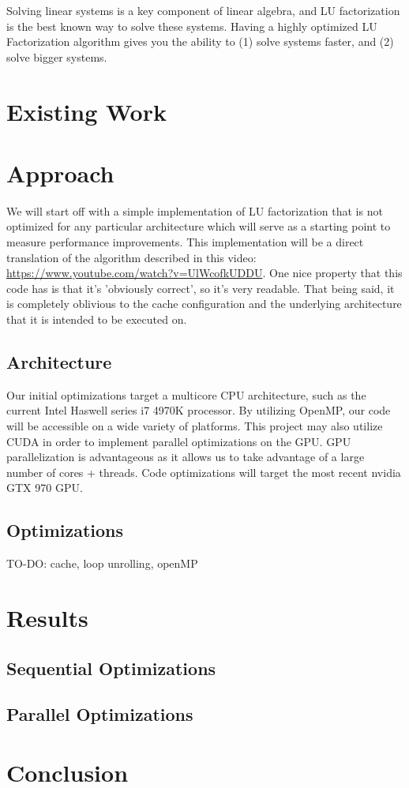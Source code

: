 \documentclass[12]{article}
\begin{document}
Solving linear systems is a key component of linear algebra, and LU factorization is the best known way to solve these systems.  Having a highly optimized LU Factorization algorithm gives you the ability to (1) solve systems faster, and (2) solve bigger systems. 

\section{Existing Work}

\section{Approach}

We will start off with a simple implementation of LU factorization that is not optimized for any particular architecture which will serve as a starting point to measure performance improvements.  This implementation will be a direct translation of the algorithm described in this video: 
\url{https://www.youtube.com/watch?v=UlWcofkUDDU}.  One nice property that this code has is that it's 'obviously correct', so it's very readable.  That being said, it is completely oblivious to the cache configuration and the underlying architecture that it is intended to be executed on.

\subsection{Architecture}

Our initial optimizations target a multicore CPU architecture, such as the current Intel Haswell series i7 4970K processor. By utilizing OpenMP, our code will be accessible on a wide variety of platforms. This project may also utilize CUDA in order to implement parallel optimizations on the GPU. GPU parallelization is advantageous as it allows us to take advantage of a large number of cores + threads. Code optimizations will target the most recent nvidia GTX 970 GPU. 

\subsection{Optimizations}

TO-DO: cache, loop unrolling, openMP

\section{Results}

\subsection{Sequential Optimizations}

\subsection{Parallel Optimizations}

\section{Conclusion}
\end{document}
